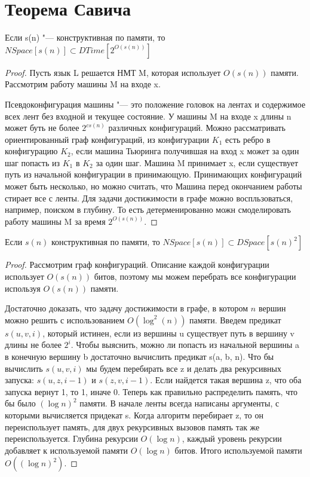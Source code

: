 \section{Теорема Савича}
\begin{theorem}
	Если s(n) "--- конструктивная по памяти, то 
	$NSpace[s(n)] \subset DTime[2^{O(s(n))}]$
\end{theorem}
\begin{proof}
	Пусть язык L решается НМТ M, которая использует $O(s(n))$ памяти. 
	Рассмотрим работу машины M на входе x. 

	Псевдоконфигурация машины "--- это положение головок на лентах 
	и содержимое всех лент без входной и текущее состояние. У машины 
	M на входе x длины n может буть не более $2^{cs(n)}$ различных
	конфигураций.  Можно рассматривать ориентированный граф конфигураций, 
	из конфигурации $K_1$ есть ребро в конфигурацию $K_2$, если машина 
	Тьюринга получившая на вход x может за один шаг попасть из $K_1$ в 
	$K_2$ за один шаг. Машина M принимает x, если существует путь из
	начальной конфигурации в принимающую. Принимающих конфигураций
	может быть несколько, но можно считать, что Машина перед окончанием работы
	стирает все с ленты. Для задачи достижимости в графе можно воспльзоваться,
	например, поиском в глубину. То есть детерменированно
	можн смоделировать работу машины M за время $2^{O(s(n))}$.
\end{proof}

\begin{theorem}
	Если $s(n)$ конструктивная по памяти, то 
	$NSpace[s(n)] \subset DSpace[s(n)^2]$
\end{theorem}
\begin{proof}
	Рассмотрим граф конфигураций. Описание каждой конфигурации использует
	$O(s(n))$ битов, поэтому мы можем перебрать все конфигурации используя
	$O(s(n))$ памяти.

	Достаточно доказать, что задачу достижимости в графе, в котором
	$n$ вершин можно решить с использованием $O(\log^2(n))$ памяти.
	Введем предикат $s(u, v, i)$, который истинен, если из вершины u
	существует путь в вершину v длины не более $2^i$. Чтобы выяснить, 
	можно ли попасть из начальной вершины a в конечную вершину b достаточно 
	вычислить предикат s(a, b, n). Что бы вычислить 
	$s(u, v,i)$ мы будем перебирать все z и делать два рекурсивных запуска:
	$s(u, z, i - 1)$ и $s(z, v, i - 1)$. Если найдется такая вершина z, что 
	оба запуска вернут 1, то 1, иначе 0. Теперь как правильно распределить 
	память, что бы было $(\log n)^2$ памяти. В начале ленты всегда написаны 
	аргументы, с которыми вычисляется придекат s. Когда алгоритм 
	перебирает z, то он переиспользует память, для двух рекурсивных 
	вызовов память так же переиспользуется. Глубина рекурсии $O(\log n)$, 
	каждый уровень рекурсии добавляет к используемой памяти $O(\log n)$ битов. 
	Итого используемой памяти $O((\log n)^2)$. 
\end{proof}